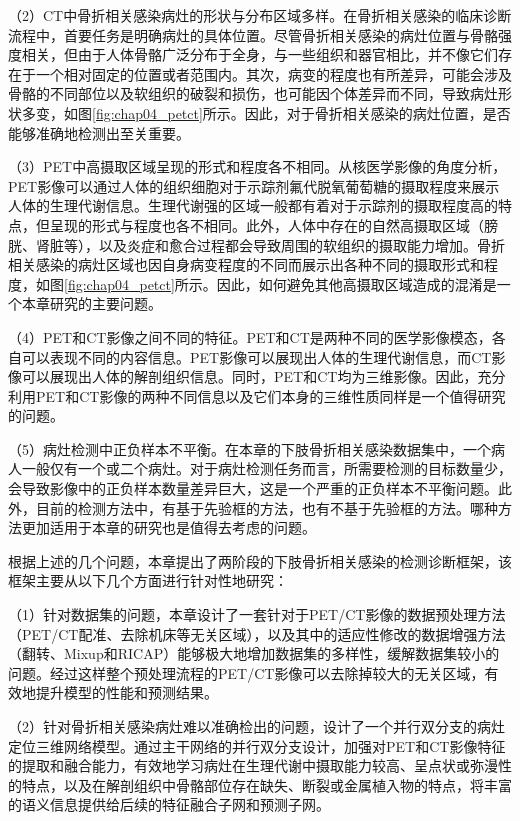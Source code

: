 （2）CT中骨折相关感染病灶的形状与分布区域多样。在骨折相关感染的临床诊断流程中，首要任务是明确病灶的具体位置。尽管骨折相关感染的病灶位置与骨骼强度相关，但由于人体骨骼广泛分布于全身，与一些组织和器官相比，并不像它们存在于一个相对固定的位置或者范围内。其次，病变的程度也有所差异，可能会涉及骨骼的不同部位以及软组织的破裂和损伤，也可能因个体差异而不同，导致病灶形状多变，如图\ref{fig:chap04_petct}所示。因此，对于骨折相关感染的病灶位置，是否能够准确地检测出至关重要。

（3）PET中高摄取区域呈现的形式和程度各不相同。从核医学影像的角度分析，PET影像可以通过人体的组织细胞对于示踪剂氟代脱氧葡萄糖的摄取程度来展示人体的生理代谢信息。生理代谢强的区域一般都有着对于示踪剂的摄取程度高的特点，但呈现的形式与程度也各不相同。此外，人体中存在的自然高摄取区域（膀胱、肾脏等），以及炎症和愈合过程都会导致周围的软组织的摄取能力增加。骨折相关感染的病灶区域也因自身病变程度的不同而展示出各种不同的摄取形式和程度，如图\ref{fig:chap04_petct}所示。因此，如何避免其他高摄取区域造成的混淆是一个本章研究的主要问题。

（4）PET和CT影像之间不同的特征。PET和CT是两种不同的医学影像模态，各自可以表现不同的内容信息。PET影像可以展现出人体的生理代谢信息，而CT影像可以展现出人体的解剖组织信息。同时，PET和CT均为三维影像。因此，充分利用PET和CT影像的两种不同信息以及它们本身的三维性质同样是一个值得研究的问题。

（5）病灶检测中正负样本不平衡。在本章的下肢骨折相关感染数据集中，一个病人一般仅有一个或二个病灶。对于病灶检测任务而言，所需要检测的目标数量少，会导致影像中的正负样本数量差异巨大，这是一个严重的正负样本不平衡问题。此外，目前的检测方法中，有基于先验框的方法，也有不基于先验框的方法。哪种方法更加适用于本章的研究也是值得去考虑的问题。

根据上述的几个问题，本章提出了两阶段的下肢骨折相关感染的检测诊断框架，该框架主要从以下几个方面进行针对性地研究：

（1）针对数据集的问题，本章设计了一套针对于PET/CT影像的数据预处理方法（PET/CT配准、去除机床等无关区域），以及其中的适应性修改的数据增强方法（翻转、Mixup\cite{zhang2018mixup}和RICAP\cite{takahashi2018ricap}）能够极大地增加数据集的多样性，缓解数据集较小的问题。经过这样整个预处理流程的PET/CT影像可以去除掉较大的无关区域，有效地提升模型的性能和预测结果。

（2）针对骨折相关感染病灶难以准确检出的问题，设计了一个并行双分支的病灶定位三维网络模型。通过主干网络的并行双分支设计，加强对PET和CT影像特征的提取和融合能力，有效地学习病灶在生理代谢中摄取能力较高、呈点状或弥漫性的特点，以及在解剖组织中骨骼部位存在缺失、断裂或金属植入物的特点，将丰富的语义信息提供给后续的特征融合子网和预测子网。

